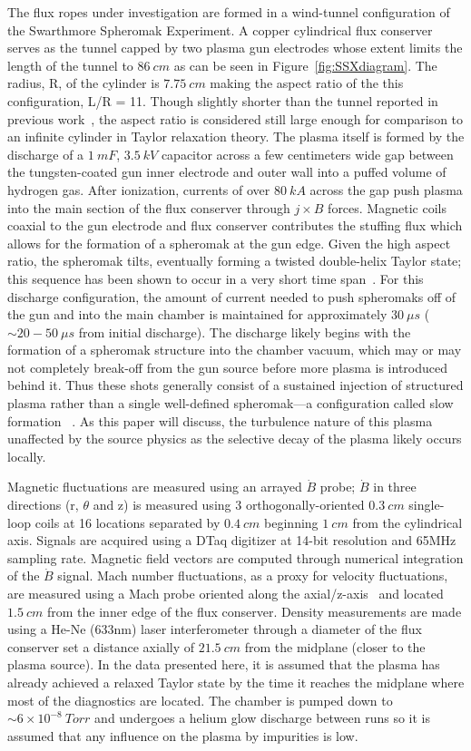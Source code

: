 \documentclass[12pt]{iopart}
\begin{document}
The flux ropes under investigation are formed in a wind-tunnel configuration of the Swarthmore Spheromak Experiment. A copper cylindrical flux conserver serves as the tunnel capped by two plasma gun electrodes whose extent limits the length of the tunnel to $86~cm$ as can be seen in Figure~\ref{fig:SSXdiagram}. The radius, R,  of the cylinder is $7.75~cm$ making the aspect ratio of the this configuration, L/R = 11. Though slightly shorter than the tunnel reported in previous work~\cite{Gray13}, the aspect ratio is considered still large enough for comparison to an infinite cylinder in Taylor relaxation theory. The plasma itself is formed by the discharge of a $1~mF$, $3.5~kV$ capacitor across a few centimeters wide gap between the tungsten-coated gun inner electrode and outer wall into a puffed volume of hydrogen gas. After ionization, currents of over $80~kA$ across the gap push plasma into the main section of the flux conserver through $j \times B$ forces. Magnetic coils coaxial to the gun electrode and flux conserver contributes the stuffing flux which allows for the formation of a spheromak at the gun edge. Given the high aspect ratio, the spheromak tilts, eventually forming a twisted double-helix Taylor state; this sequence has been shown to occur in a very short time span~\cite{Gray13}. For this discharge configuration, the amount of current needed to push spheromaks off of the gun and into the main chamber is maintained for approximately $30~\mu s$ ($\sim 20-50~\mu s$ from initial discharge). The discharge likely begins with the formation of a spheromak structure into the chamber vacuum, which may or may not completely break-off from the gun source before more plasma is introduced behind it. Thus these shots generally consist of a sustained injection of structured plasma rather than a single well-defined spheromak---a configuration called slow formation~\cite{jarboe83} . As this paper will discuss, the turbulence nature of this plasma unaffected by the source physics as the selective decay of the plasma likely occurs locally.

Magnetic fluctuations are measured using an arrayed $\dot{B}$ probe; $\dot{B}$ in three directions (r, $\theta$ and z) is measured using 3 orthogonally-oriented $0.3~cm$ single-loop coils at 16 locations separated by $0.4~cm$ beginning $1~cm$ from the cylindrical axis. Signals are acquired using a DTaq digitizer at 14-bit resolution and 65MHz sampling rate. Magnetic field vectors are computed through numerical integration of the $\dot{B}$ signal. Mach number fluctuations, as a proxy for velocity fluctuations, are measured using a Mach probe oriented along the axial/z-axis~\cite{Zhang11} and located $1.5~cm$ from the inner edge of the flux conserver. Density measurements are made using a He-Ne (633nm) laser interferometer through a diameter of the flux conserver set a distance axially of $21.5~cm$ from the midplane (closer to the plasma source). In the data presented here, it is assumed that the plasma has already achieved a relaxed Taylor state by the time it reaches the midplane where most of the diagnostics are located. The chamber is pumped down to $\sim 6 \times 10^{-8}~Torr$ and undergoes a helium glow discharge between runs so it is assumed that any influence on the plasma by impurities is low.
\end{document}
